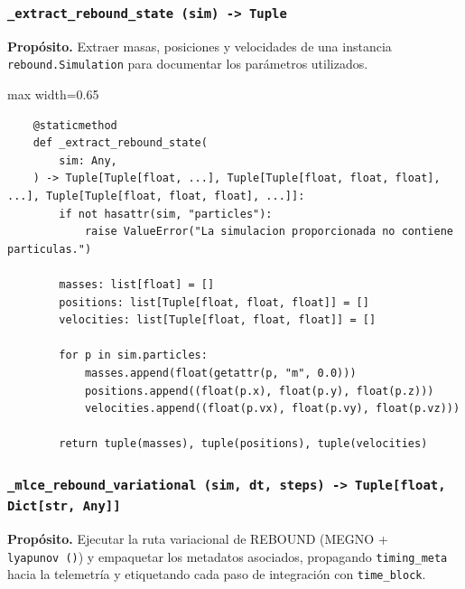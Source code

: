 \subsubsection*{\texttt{\_extract\_rebound\_state~(sim) -> Tuple}}
\vfill
\textbf{Propósito.} Extraer masas, posiciones y velocidades de una instancia \texttt{rebound.Simulation} para documentar los parámetros utilizados.\\

\begin{listing}[H]
\caption{Bloque de código de \texttt{\_extract\_rebound\_state}}
\begin{adjustbox}{max width=0.65\textwidth}
\begin{minipage}{\textwidth}
\begin{verbatim}
    @staticmethod
    def _extract_rebound_state(
        sim: Any,
    ) -> Tuple[Tuple[float, ...], Tuple[Tuple[float, float, float], ...], Tuple[Tuple[float, float, float], ...]]:
        if not hasattr(sim, "particles"):
            raise ValueError("La simulacion proporcionada no contiene particulas.")

        masses: list[float] = []
        positions: list[Tuple[float, float, float]] = []
        velocities: list[Tuple[float, float, float]] = []

        for p in sim.particles:
            masses.append(float(getattr(p, "m", 0.0)))
            positions.append((float(p.x), float(p.y), float(p.z)))
            velocities.append((float(p.vx), float(p.vy), float(p.vz)))

        return tuple(masses), tuple(positions), tuple(velocities)
\end{verbatim}
\end{minipage}
\end{adjustbox}
\end{listing}
\vspace{0.2cm}
\subsubsection*{\texttt{\_mlce\_rebound\_variational~(sim, dt, steps) -> Tuple[float, Dict[str, Any]]}}
\vfill
\textbf{Propósito.} Ejecutar la ruta variacional de REBOUND (MEGNO + \texttt{lyapunov~()}) y empaquetar los metadatos asociados, propagando \texttt{timing\_meta} hacia la telemetría y etiquetando cada paso de integración con \texttt{time\_block}.\\

